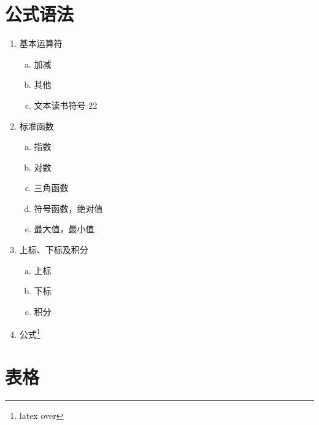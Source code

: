 \documentclass[12pt,a4paper]{article}%
\begin{document}
\section{公式语法}
\begin{enumerate}[1.]%
    \item 基本运算符
    \begin{enumerate}[(a)]%
        \item 加减%
        \item 其他%
        \item 文本读书符号 22\textdegree
    \end{enumerate}

    \item  标准函数
    \begin{enumerate}[(a)]%
    \item 指数 %
    \item 对数 %
    \item 三角函数 %
    \item 符号函数，绝对值 %
    \item 最大值，最小值 %
    \end{enumerate}

    \item 上标、下标及积分
    \begin{enumerate}[(a)]%
        \item 上标%
        \item 下标%
        \item 积分%
    \end{enumerate}

    \item 公式\footnote{latex over}%
\end{enumerate}

\section{表格}
\end{document}
